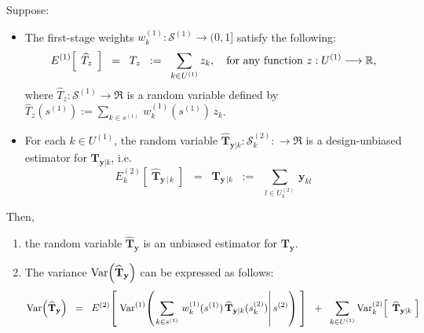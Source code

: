 \documentclass{article}
\begin{document}
\begin{proposition}
\quad
Suppose:
\begin{itemize}
\item	The first-stage weights $w^{(1)}_{k} : \mathcal{S}^{(1)} \longrightarrow (0,1]$
		satisfy the following:
		\begin{equation*}
		E^{(1)}\!\left[\;\,\widehat{T}_{z}\,\;\right] \;\; = \;\; T_{z} \;\;:=\;\; \sum_{k\in U^{(1)}}z_{k},
		\quad\textnormal{for any function $z : U^{(1)} \longrightarrow \Re$,}
		\end{equation*}
		where $\widehat{T}_{z} : \mathcal{S}^{(1)} \longrightarrow \Re$ is a random variable defined by
		$\widehat{T}_{z}(s^{(1)}) := \underset{k \in s^{(1)}}{\sum}\,w^{(1)}_{k}(s^{(1)})\,z_{k}$.
\item	For each $k \in U^{(1)}$, the random variable
		$\widehat{\mathbf{T}}_{\mathbf{y}\vert k} : \mathcal{S}^{(2)}_{k} : \longrightarrow \Re$
		is a design-unbiased
		estimator for $\mathbf{T}_{\mathbf{y}\vert k}$, i.e.
		\begin{equation*}
		E^{(2)}_{k}\!\left[\;\widehat{\mathbf{T}}_{\mathbf{y}\,\vert\,k}\;\right]
		\;\;=\;\; \mathbf{T}_{\mathbf{y}\,\vert k}
		\;\;:=\;\; \sum_{l \in U^{(2)}_{k}}\,\mathbf{y}_{kl}
		\end{equation*}
\end{itemize}
Then,
\begin{enumerate}
\item	the random variable $\widehat{\mathbf{T}}_{\mathbf{y}}$ is an unbiased estimator for $\mathbf{T}_{\mathbf{y}}$.
\item	The variance $\Var\!\left(\widehat{\mathbf{T}}_{\mathbf{y}}\right)$ can be expressed as follows:
		\begin{equation*}
		\Var\!\left(\widehat{\mathbf{T}}_{\mathbf{y}}\right)
		\;\;=\;\;
		E^{(2)}\!\left[\;\Var^{(1)}\!\left(\left.
		\sum_{k\in s^{(1)}}\,w^{(1)}_{k}(s^{(1)})\,\widehat{\mathbf{T}}_{\mathbf{y}\vert k}(s^{(2)}_{k})
		\right\vert s^{(2)}\right)\;\right]
		\;\;+\;\;
		\sum_{k\in U^{(1)}}\Var^{(2)}_{k}\!\left[\;\,\widehat{\mathbf{T}}_{\mathbf{y}\vert k}\;\right]
		\end{equation*}
\end{enumerate}
\end{proposition}
\end{document}
